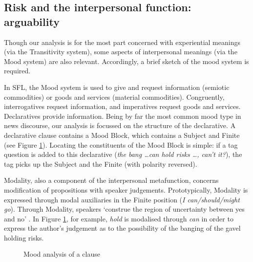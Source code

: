 
	\subsection{Risk and the interpersonal function: arguability}

		Though our analysis is for the most part concerned with experiential meanings (via the Transitivity system), some aspects of interpersonal meanings (via the Mood system) are also relevant. Accordingly, a brief sketch of the mood system is required.

		In SFL, the Mood system is used to give and request information (semiotic commodities) or goods and services (material commodities). Congruently, interrogatives request information, and imperatives request goods and services. Declaratives provide information. Being by far the most common mood type in news discourse, our analysis is focussed on the structure of the declarative. A declarative clause contains a Mood Block, which contains a Subject and Finite (see Figure \ref{fig:moodannotation}). Locating the constituents of the Mood Block is simple: if a tag question is added to this declarative (\emph{the bang \dots can hold risks \dots, can't it?}), the tag picks up the Subject and the Finite (with polarity reversed).

		Modality, also a component of the interpersonal metafunction, concerns modification of propositions with speaker judgements.
		Prototypically, Modality is expressed through modal auxiliaries in the Finite position (\emph{I can/should/might go}). Through Modality, speakers `construe the region of uncertainty between yes and no' \cite[p.~147]{halliday_introduction_2004}. In Figure \ref{fig:moodannotation}, for example, \emph{hold} is modalised through \emph{can} in order to express the author's judgement as to the possibility of the banging of the gavel holding risks.

			\begin{figure}[htb]
			\centering \small \onehalfspacing
			\caption{Mood analysis of a clause}
			    			\label{fig:moodannotation}
			\end{figure}


